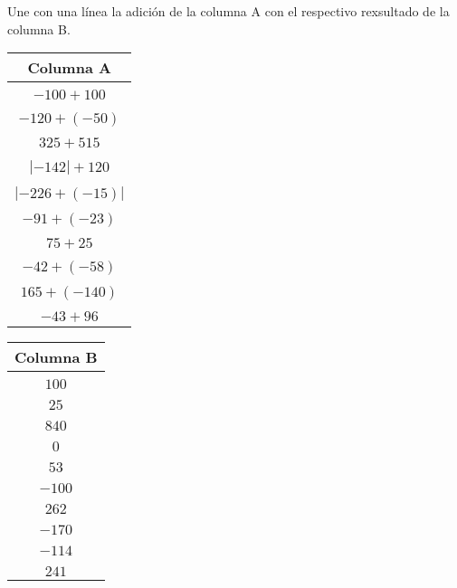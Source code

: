 \documentclass[spanish,letterpaper, 11pt, addpoints, answers]{exam}
\begin{document}
\begin{questions}

\question Une con una línea la adición de la columna A con el respectivo rexsultado de la columna B.

\begin{minipage}{0.4\linewidth}
  \begin{tcolorbox}[colback=white]
  \begin{center}
    \begin{tabular}{c}
      \textbf{Columna A} \\ \hline \\
      $-100+100$\\\\
      $-120+(-50)$\\\\
      $325+515$\\\\
      $|-142|+120$\\\\
      $|-226+(-15)|$\\\\
      $-91+(-23)$\\\\
      $75+25$\\\\
      $-42+(-58)$\\\\
      $165+(-140)$\\\\
      $-43+96$
      
    \end{tabular}
  \end{center}
\end{tcolorbox}
\end{minipage}
\hfill
\begin{minipage}{0.4\linewidth}
  \begin{tcolorbox}[colback=white]
  \begin{center}
    \begin{tabular}{c}
      \textbf{Columna B} \\ \hline \\
      $100$\\\\
      $25$\\\\
      $840$\\\\
      $0$\\\\
      $53$\\\\
      $-100$\\\\
      $262$\\\\
      $-170$\\\\
      $-114$\\\\
      $241$
      

\end{tabular}
\end{center}
\end{tcolorbox}
\end{minipage}
\end{questions}
\end{document}
